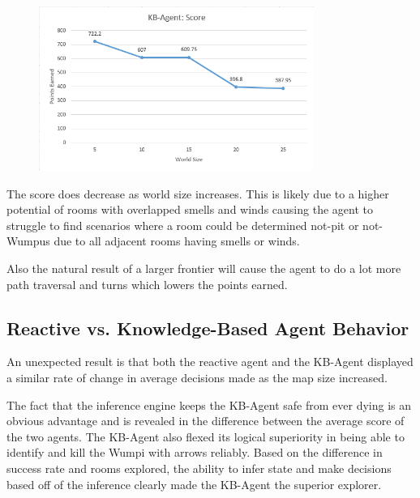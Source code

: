 \begin{figure}[!htb]
\caption{}
    \centering
	\includegraphics[width=0.8\textwidth]{figures/KBAgent_AveragePoints.PNG}
    \label{fig:KBAvgPoints}
\end{figure}

The score does decrease as world size increases.
This is likely due to a higher potential of rooms with overlapped smells and winds causing the agent to struggle to find scenarios where a room could be determined not-pit or not-Wumpus due to all adjacent rooms having smells or winds.

Also the natural result of a larger frontier will cause the agent to do a lot more path traversal and turns which lowers the points earned.

\subsection{Reactive vs. Knowledge-Based Agent Behavior} \label{subsec:RaKB-aBehavior}
An unexpected result is that both the reactive agent and the KB-Agent displayed a similar rate of change in average decisions made as the map size increased.

The fact that the inference engine keeps the KB-Agent safe from ever dying is an obvious advantage and is revealed in the difference between the average score of the two agents.
The KB-Agent also flexed its logical superiority in being able to identify and kill the Wumpi with arrows reliably.
Based on the difference in success rate and rooms explored, the ability to infer state and make decisions based off of the inference clearly made the KB-Agent the superior explorer.

\newpage
